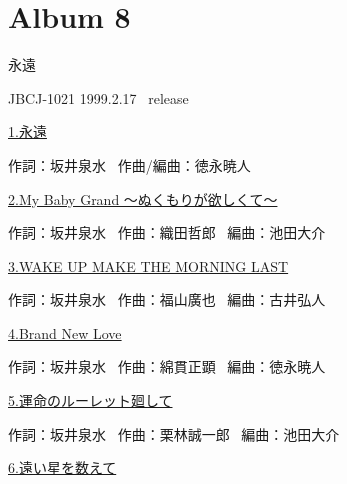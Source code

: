 
\chapter{Album 8}
\thispagestyle{empty} %
\vspace{-16mm}
\LARGE {永遠}

\normalsize{JBCJ-1021 1999.2.17 \ release}
\\

\vspace{-5mm}


\small{\hyperlink{8_0}{1.永遠}}

\tiny{作詞：坂井泉水 \ 作曲/編曲：徳永暁人}

\small{\hyperlink{8_1}{2.My Baby Grand ～ぬくもりが欲しくて～}}

\tiny{作詞：坂井泉水 \ 作曲：織田哲郎  \ 編曲：池田大介}

\small{\hyperlink{8_2}{3.WAKE UP MAKE THE MORNING LAST}}

\tiny{作詞：坂井泉水 \ 作曲：福山廣也  \ 編曲：古井弘人}

\small{\hyperlink{8_3}{4.Brand New Love}}

\tiny{作詞：坂井泉水 \ 作曲：綿貫正顕  \ 編曲：徳永暁人}

\small{\hyperlink{8_4}{5.運命のルーレット廻して}}

\tiny{作詞：坂井泉水 \ 作曲：栗林誠一郎  \ 編曲：池田大介}

\small{\hyperlink{8_5}{6.遠い星を数えて}}

